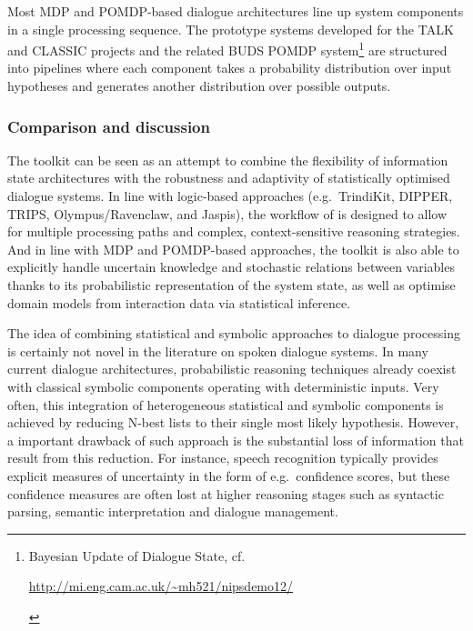 Most MDP and POMDP-based dialogue architectures line up system components in a single processing sequence. The prototype systems developed for the TALK and CLASSIC projects \citep{Henderson:2008,Lemon:2012} and the related BUDS POMDP system\footnote{Bayesian Update of Dialogue State, cf. \begin{scriptsize}\url{http://mi.eng.cam.ac.uk/~mh521/nipsdemo12/}\end{scriptsize}} are structured into pipelines where each component takes a probability distribution over input hypotheses and generates another distribution over possible outputs.  



\subsubsection*{Comparison and discussion}

The \opendial{} toolkit can be seen as an attempt to combine the flexibility of information state architectures with the robustness and adaptivity of statistically optimised dialogue systems.  In line with logic-based approaches (e.g.\ TrindiKit, DIPPER, TRIPS, Olympus/Ravenclaw, and Jaspis), the workflow of \opendial{} is designed to allow for multiple processing paths and complex, context-sensitive reasoning strategies.  And in line with MDP and POMDP-based approaches, the toolkit is also able to explicitly handle uncertain knowledge and stochastic relations between variables thanks to its probabilistic representation of the system state, as well as optimise domain models from interaction data via statistical inference.  

The idea of combining statistical and symbolic approaches to dialogue processing is certainly not novel in the literature on spoken dialogue systems.  In many current dialogue architectures, probabilistic reasoning techniques already coexist with classical symbolic components operating with deterministic inputs. Very often, this integration of heterogeneous statistical and symbolic components is achieved by reducing N-best lists to their single most likely hypothesis. However, a important drawback of such approach is the substantial loss of information that result from this reduction. For instance, speech recognition typically provides explicit measures of uncertainty in the form of e.g.\ confidence scores, but these confidence measures are often lost at higher reasoning stages such as syntactic parsing, semantic interpretation and dialogue management. 


